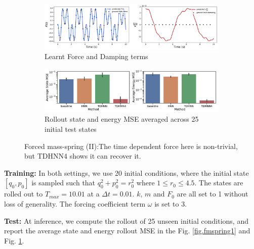\documentclass{article}
\begin{document}
\begin{figure}[h!]
\centering
\captionsetup{justification=centering}
	\begin{subfigure}[b]{0.48\textwidth}
		\centering
		\includegraphics[width=\textwidth]{figures/figures/forced_mass_spring/2/forced_mass_spring_dpdt_new_0.pdf}
		\caption{Learnt Force and Damping terms}
	\end{subfigure}
	\begin{subfigure}[b]{0.48\textwidth}
	    \centering
		\includegraphics[width=\textwidth]{figures/figures/forced_mass_spring/2/forced_mass_spring_errors_0.pdf}
		\caption{Rollout state and energy MSE averaged across 25 initial test states}
	\end{subfigure}
\caption{Forced mass-spring (II):The time dependent force here is non-trivial, but TDHNN4 shows it can recover it.}
\label{fig.fmspring2}
\end{figure}
\textbf{Training:} In both settings, we use 20 initial conditions, where the initial state $[q_0,p_0]$ is sampled such that $q_0^2 +p_0^2 =r_0^2$ where $1 \leq r_0 \leq 4.5$. The states are rolled out to $T_{max}=10.01$ at a $\Delta t = 0.01$. $k$, $m$ and $F_0$ are all set to 1 without loss of generality. The forcing coefficient term $\omega$ is set to 3. 

\textbf{Test:} At inference, we compute the rollout of 25 unseen initial conditions, and report the average state and energy rollout MSE in the Fig. \ref{fig.fmspring1} and Fig. \ref{fig.fmspring2}.
\end{document}
